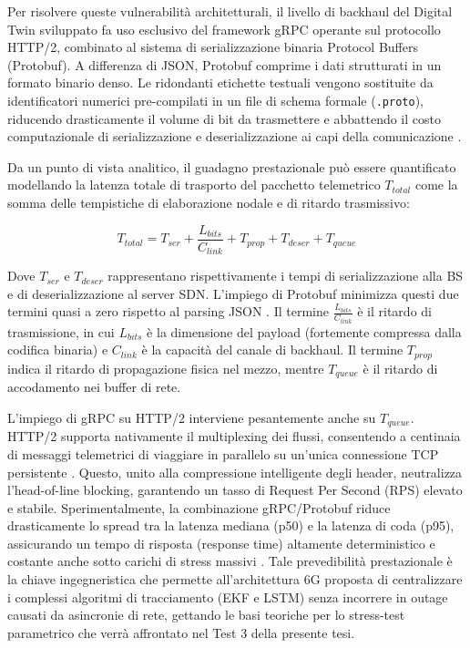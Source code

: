 \documentclass[twoside]{article}
\begin{document}
Per risolvere queste vulnerabilità architetturali, il livello di backhaul del Digital Twin sviluppato fa uso esclusivo del framework gRPC operante sul protocollo HTTP/2, combinato al sistema di serializzazione binaria Protocol Buffers (Protobuf). A differenza di JSON, Protobuf comprime i dati strutturati in un formato binario denso. Le ridondanti etichette testuali vengono sostituite da identificatori numerici pre-compilati in un file di schema formale (\texttt{.proto}), riducendo drasticamente il volume di bit da trasmettere e abbattendo il costo computazionale di serializzazione e deserializzazione ai capi della comunicazione \cite{Vairam2023}.

Da un punto di vista analitico, il guadagno prestazionale può essere quantificato modellando la latenza totale di trasporto del pacchetto telemetrico $T_{total}$ come la somma delle tempistiche di elaborazione nodale e di ritardo trasmissivo: 

\begin{equation}
T_{total} = T_{ser} + \frac{L_{bits}}{C_{link}} + T_{prop} + T_{deser} + T_{queue}
\label{eq:backhaul_latency}
\end{equation}

Dove $T_{ser}$ e $T_{deser}$ rappresentano rispettivamente i tempi di serializzazione alla BS e di deserializzazione al server SDN. L'impiego di Protobuf minimizza questi due termini quasi a zero rispetto al parsing JSON \cite{Vairam2023}. Il termine $\frac{L_{bits}}{C_{link}}$ è il ritardo di trasmissione, in cui $L_{bits}$ è la dimensione del payload (fortemente compressa dalla codifica binaria) e $C_{link}$ è la capacità del canale di backhaul. Il termine $T_{prop}$ indica il ritardo di propagazione fisica nel mezzo, mentre $T_{queue}$ è il ritardo di accodamento nei buffer di rete.

L'impiego di gRPC su HTTP/2 interviene pesantemente anche su $T_{queue}$. HTTP/2 supporta nativamente il multiplexing dei flussi, consentendo a centinaia di messaggi telemetrici di viaggiare in parallelo su un'unica connessione TCP persistente \cite{Vairam2023}. Questo, unito alla compressione intelligente degli header, neutralizza l'head-of-line blocking, garantendo un tasso di Request Per Second (RPS) elevato e stabile. Sperimentalmente, la combinazione gRPC/Protobuf riduce drasticamente lo spread tra la latenza mediana (p50) e la latenza di coda (p95), assicurando un tempo di risposta (response time) altamente deterministico e costante anche sotto carichi di stress massivi \cite{Vairam2023}. Tale prevedibilità prestazionale è la chiave ingegneristica che permette all'architettura 6G proposta di centralizzare i complessi algoritmi di tracciamento (EKF e LSTM) senza incorrere in outage causati da asincronie di rete, gettando le basi teoriche per lo stress-test parametrico che verrà affrontato nel Test 3 della presente tesi.
\clearpage
\end{document}
